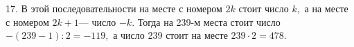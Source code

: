 17. В этой последовательности на месте с номером $2k$ стоит число $k,$ а на месте с номером $2k+1$--- число $-k.$ Тогда на 239-м места стоит число $-(239-1):2=-119,$ а число 239 стоит на месте $239\cdot2=478.$\\
